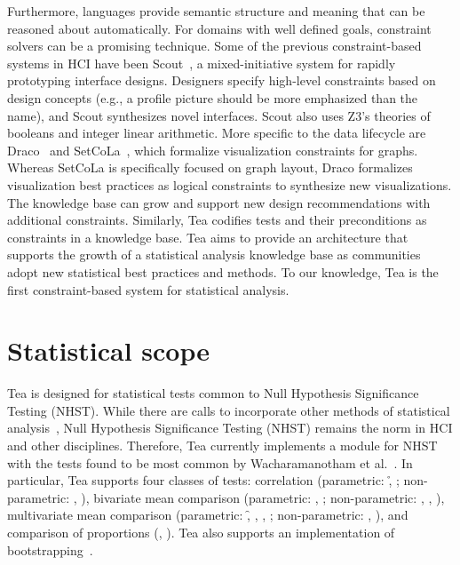 Furthermore, languages provide semantic structure and meaning that can be
reasoned about automatically. For domains with well defined goals, constraint
solvers can be a promising technique. Some of the previous constraint-based
systems in HCI have been Scout~\cite{swearngin2018scout}, a mixed-initiative
system for rapidly prototyping interface designs. Designers specify high-level
constraints based on design concepts (e.g., a profile picture should be more
emphasized than the name), and Scout synthesizes novel interfaces. Scout also
uses Z3's theories of booleans and integer linear arithmetic. More specific to
the data lifecycle are Draco~\cite{moritz2019formalizing} and
SetCoLa~\cite{hoffswell2018setcola}, which formalize visualization constraints
for graphs. Whereas SetCoLa is specifically focused on graph layout, Draco
formalizes visualization best practices as logical constraints to synthesize new
visualizations. The knowledge base can grow and support new design
recommendations with additional constraints. Similarly, Tea codifies tests and
their preconditions as constraints in a knowledge base. Tea aims to provide an
architecture that supports the growth of a statistical analysis knowledge base
as communities adopt new statistical best practices and methods. To our
knowledge, Tea is the first constraint-based system for statistical analysis. 


\section*{Statistical scope}
Tea is designed for statistical tests common to Null Hypothesis Significance
Testing (NHST). While there are calls to incorporate other methods of
statistical analysis~\cite{kay2016researcher,kaptein2012rethinking}, Null
Hypothesis Significance Testing (NHST) remains the norm in HCI and other
disciplines. Therefore, Tea currently implements a module for NHST with the
tests found to be most common by Wacharamanotham et
al.~\cite{wacharamanotham2015statsplorer}. In particular, Tea supports four
classes of tests: correlation (parametric: \r, \pb; non-parametric: \ktau,
\srho), bivariate mean comparison (parametric: \student, \paired;
non-parametric: \mannu, \wilcox, \welch), multivariate mean comparison
(parametric: \f, \rm, \facANOVA, \twoANOVA; non-parametric: \kw, \friedman), and
comparison of proportions (\chiSq, \fisher). Tea also supports an implementation
of bootstrapping~\cite{efron1992bootstrap}.